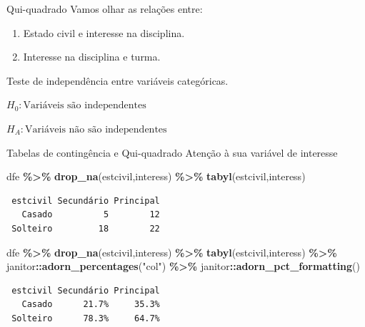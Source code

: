 \documentclass[
  9pt,
  ignorenonframetext,
  aspectratio=169]{beamer}
\newenvironment{Shaded}{\begin{snugshade}}{\end{snugshade}}
\newcommand{\KeywordTok}[1]{\textcolor[rgb]{0.13,0.29,0.53}{\textbf{#1}}}
\newcommand{\NormalTok}[1]{#1}
\newcommand{\OperatorTok}[1]{\textcolor[rgb]{0.81,0.36,0.00}{\textbf{#1}}}
\newcommand{\StringTok}[1]{\textcolor[rgb]{0.31,0.60,0.02}{#1}}
\begin{document}
\begin{frame}{Qui-quadrado}
\protect\hypertarget{qui-quadrado}{}
Vamos olhar as relações entre:

\begin{enumerate}
\item
  Estado civil e interesse na disciplina.
\item
  Interesse na disciplina e turma.
\end{enumerate}

Teste de independência entre variáveis categóricas.

\(H_0:\text{Variáveis são independentes}\)

\(H_A:\text{Variáveis não são independentes}\)
\end{frame}

\begin{frame}[fragile]{Tabelas de contingência e Qui-quadrado}
\protect\hypertarget{tabelas-de-continguxeancia-e-qui-quadrado}{}
Atenção à sua variável de interesse

\begin{Shaded}
\begin{Highlighting}[]
\NormalTok{dfe }\OperatorTok{\%\textgreater{}\%}\StringTok{ }\KeywordTok{drop\_na}\NormalTok{(estcivil,interess) }\OperatorTok{\%\textgreater{}\%}
\StringTok{  }\KeywordTok{tabyl}\NormalTok{(estcivil,interess)}
\end{Highlighting}
\end{Shaded}

\begin{verbatim}
 estcivil Secundário Principal
   Casado          5        12
 Solteiro         18        22
\end{verbatim}

\begin{Shaded}
\begin{Highlighting}[]
\NormalTok{dfe }\OperatorTok{\%\textgreater{}\%}\StringTok{ }\KeywordTok{drop\_na}\NormalTok{(estcivil,interess) }\OperatorTok{\%\textgreater{}\%}
\StringTok{  }\KeywordTok{tabyl}\NormalTok{(estcivil,interess) }\OperatorTok{\%\textgreater{}\%}\StringTok{ }
\StringTok{  }\NormalTok{janitor}\OperatorTok{::}\KeywordTok{adorn\_percentages}\NormalTok{(}\StringTok{"col"}\NormalTok{) }\OperatorTok{\%\textgreater{}\%}
\StringTok{  }\NormalTok{janitor}\OperatorTok{::}\KeywordTok{adorn\_pct\_formatting}\NormalTok{()}
\end{Highlighting}
\end{Shaded}

\begin{verbatim}
 estcivil Secundário Principal
   Casado      21.7%     35.3%
 Solteiro      78.3%     64.7%
\end{verbatim}
\end{frame}
\end{document}
